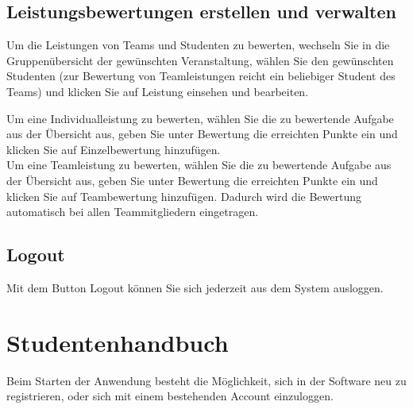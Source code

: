 \documentclass{Handbuch}
\begin{document}
\subsection{Leistungsbewertungen erstellen und verwalten}
\begin{center}
\end{center}
Um die Leistungen von Teams und Studenten zu bewerten, wechseln Sie in die Gruppenübersicht der gewünschten Veranstaltung, wählen Sie den gewünschten Studenten (zur Bewertung von Teamleistungen reicht ein beliebiger Student des Teams) und klicken Sie auf \frqq Leistung einsehen und bearbeiten\flqq. 
\begin{center}
\end{center}
Um eine Individualleistung zu bewerten, wählen Sie die zu bewertende Aufgabe aus der Übersicht aus, geben Sie unter \glqq Bewertung\grqq{} die erreichten Punkte ein und klicken Sie auf \frqq Einzelbewertung hinzufügen\flqq.\\
Um eine Teamleistung zu bewerten, wählen Sie die zu bewertende Aufgabe aus der Übersicht aus, geben Sie unter \glqq Bewertung\grqq{} die erreichten Punkte ein und klicken Sie auf \frqq Teambewertung hinzufügen\flqq. Dadurch wird die Bewertung automatisch bei allen Teammitgliedern eingetragen. 


\subsection{Logout}
Mit dem Button \frqq Logout\flqq{} können Sie sich jederzeit aus dem System ausloggen.


\newpage
\section{Studentenhandbuch}
Beim Starten der Anwendung besteht die Möglichkeit, sich in der Software neu zu registrieren, oder sich mit einem bestehenden Account einzuloggen.
\end{document}
